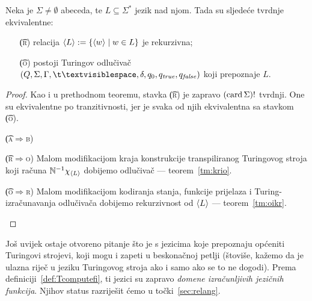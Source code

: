 \begin{teorem}
Neka je $\Sigma\not=\emptyset$ abeceda, te $L\subseteq\Sigma^*$ jezik nad njom. Tada su sljedeće tvrdnje ekvivalentne:
\begin{itemize}
    \item[\t{(\textsc r)}] relacija $\langle L\rangle:=\{\langle w\rangle\mid w\in L\}$ je rekurzivna;
    \item[\t{(\textsc o)}] postoji Turingov odlučivač $(Q,\Sigma,\Gamma,\bl,\delta,q_0,q_\mathit{true},q_\mathit{false})$ koji prepoznaje $L$.
\end{itemize}
\end{teorem}
\begin{proof}
Kao i u prethodnom teoremu, stavka \t{(\textsc r)} je zapravo $(\operatorname{card}\Sigma)!$ tvrdnji. One su ekvivalentne po tranzitivnosti, jer je svaka od njih ekvivalentna sa stavkom \t{(\textsc o)}.
\begin{labeling}{\t{(\textsc a$\Rightarrow$\textsc b)}}
\item[\t{(\textsc r$\Rightarrow$\textsc o)}] Malom modifikacijom kraja konstrukcije transpiliranog Turingovog stro\-ja koji računa ${\mathbb N}^{-1}\chi_{\langle L\rangle}$ dobijemo odlučivač --- teorem~\ref{tm:krio}.
\item[\t{(\textsc o$\Rightarrow$\textsc r)}] Malom modifikacijom kodiranja stanja, funkcije prijelaza i Turing-iz\-ra\-ču\-na\-va\-nja odlučivača dobijemo rekurzivnost od $\langle L\rangle$ --- teorem~\ref{tm:oikr}.\qedhere
\end{labeling}
\end{proof}

Još uvijek ostaje otvoreno pitanje što je s jezicima koje prepoznaju općeniti Turingovi strojevi, koji mogu i zapeti u beskonačnoj petlji (štoviše, kažemo da je ulazna riječ u jeziku Turingovog stroja ako i samo ako se to ne dogodi). Prema definiciji~\ref{def:Tcomputefi}, ti jezici su zapravo \emph{domene izračunljivih jezičnih funkcija}. Njihov status razriješit ćemo u točki~\ref{sec:relang}.

